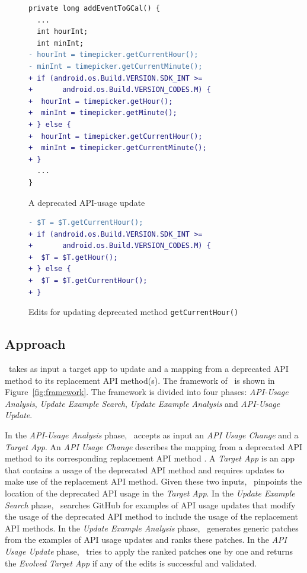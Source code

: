 \begin{figure}[htb]
\centering
\begin{lstlisting}[language=diff,numbers=none]
private long addEventToGCal() {
  ...
  int hourInt;
  int minInt;
- hourInt = timepicker.getCurrentHour();
- minInt = timepicker.getCurrentMinute();
+ if (android.os.Build.VERSION.SDK_INT >= 
+       android.os.Build.VERSION_CODES.M) {
+  hourInt = timepicker.getHour();
+  minInt = timepicker.getMinute();
+ } else {
+  hourInt = timepicker.getCurrentHour();
+  minInt = timepicker.getCurrentMinute();
+ }
  ...
}
\end{lstlisting}
\caption{A deprecated API-usage update}
\label{fig:deprecated_api_update_example}
\end{figure}

\begin{figure}[htb]
\centering
\begin{lstlisting}[language=diff,numbers=none]
- $T = $T.getCurrentHour();
+ if (android.os.Build.VERSION.SDK_INT >= 
+       android.os.Build.VERSION_CODES.M) {
+  $T = $T.getHour();
+ } else {
+  $T = $T.getCurrentHour();
+ }
\end{lstlisting}
\caption{Edits for updating deprecated method \texttt{getCurrentHour()}}
\label{fig:deprecated_api_update_edits}
\end{figure}

\subsection{Approach}
\toolname\ takes as input a target app to update and a mapping from a
deprecated API method  to its replacement API method(s). The
framework of \toolname\ is shown in Figure~\ref{fig:framework}. The
framework is divided into four phases: {\em API-Usage Analysis}, {\em
  Update Example Search}, {\em Update Example Analysis} and {\em API-Usage
  Update}.

In the {\em API-Usage Analysis} phase, \toolname\ accepts as input an {\em
  API Usage Change} and a {\em Target App}. An {\em API Usage Change}
describes the mapping from a deprecated API method to its corresponding
replacement API method  . A {\em Target App} is an app
that contains a usage of the deprecated API method and requires updates to
make use of the replacement API method. Given these two inputs,
\toolname\ pinpoints the location of the deprecated API usage in the {\em
  Target App}. In the {\em Update Example Search} phase,
\toolname\ searches GitHub for examples of API usage updates that modify
the usage of the deprecated API method to include the usage of the
replacement API methods. In the {\em Update Example Analysis} phase,
\toolname\ generates generic patches  from the examples of API usage updates and ranks these patches. In
the {\em API Usage Update} phase, \toolname\ tries to apply the ranked
patches one by one and returns the {\em Evolved Target App} if any of the
edits is successful and validated.

